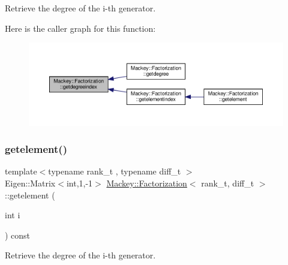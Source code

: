 Retrieve the degree of the i-\/th generator. 

Here is the caller graph for this function\+:\nopagebreak
\begin{figure}[H]
\begin{center}
\leavevmode
\includegraphics[width=350pt]{classMackey_1_1Factorization_ab90f461af3418417970d4be8682e965d_icgraph}
\end{center}
\end{figure}
\mbox{\label{classMackey_1_1Factorization_a6e15f1fb3623685326255f7badf7eee9}} 
\subsubsection{\texorpdfstring{getelement()}{getelement()}}
{\footnotesize\ttfamily template$<$typename rank\+\_\+t , typename diff\+\_\+t $>$ \\
Eigen\+::\+Matrix$<$int,1,-\/1$>$ \hyperlink{classMackey_1_1Factorization}{Mackey\+::\+Factorization}$<$ rank\+\_\+t, diff\+\_\+t $>$\+::getelement (\begin{DoxyParamCaption}\item[{int}]{i }\end{DoxyParamCaption}) const\hspace{0.3cm}{\ttfamily [inline]}}



Retrieve the degree of the i-\/th generator. 

